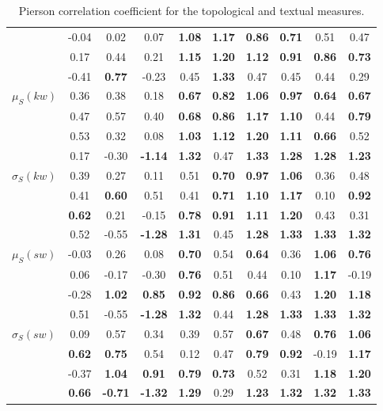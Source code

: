 \begin{table*}[h!]
\begin{center}
\begin{tabular}{| l || c | c | c | c | c | c | c | c | c |}
 & -0.04 & 0.02 & 0.07 & {\bf 1.08} & {\bf 1.17} & {\bf 0.86} & {\bf 0.71} & 0.51 & 0.47 \\
 & 0.17 & 0.44 & 0.21 & {\bf 1.15} & {\bf 1.20} & {\bf 1.12} & {\bf 0.91} & {\bf 0.86} & {\bf 0.73} \\
 & -0.41 & {\bf 0.77} & -0.23 & 0.45 & {\bf 1.33} & 0.47 & 0.45 & 0.44 & 0.29 \\\hline
$\mu_S(kw)$ & 0.36 & 0.38 & 0.18 & {\bf 0.67} & {\bf 0.82} & {\bf 1.06} & {\bf 0.97} & {\bf 0.64} & {\bf 0.67} \\
 & 0.47 & 0.57 & 0.40 & {\bf 0.68} & {\bf 0.86} & {\bf 1.17} & {\bf 1.10} & 0.44 & {\bf 0.79} \\
 & 0.53 & 0.32 & 0.08 & {\bf 1.03} & {\bf 1.12} & {\bf 1.20} & {\bf 1.11} & {\bf 0.66} & 0.52 \\
 & 0.17 & -0.30 & {\bf -1.14} & {\bf 1.32} & 0.47 & {\bf 1.33} & {\bf 1.28} & {\bf 1.28} & {\bf 1.23} \\\hline
$\sigma_S(kw)$ & 0.39 & 0.27 & 0.11 & 0.51 & {\bf 0.70} & {\bf 0.97} & {\bf 1.06} & 0.36 & 0.48 \\
 & 0.41 & {\bf 0.60} & 0.51 & 0.41 & {\bf 0.71} & {\bf 1.10} & {\bf 1.17} & 0.10 & {\bf 0.92} \\
 & {\bf 0.62} & 0.21 & -0.15 & {\bf 0.78} & {\bf 0.91} & {\bf 1.11} & {\bf 1.20} & 0.43 & 0.31 \\
 & 0.52 & -0.55 & {\bf -1.28} & {\bf 1.31} & 0.45 & {\bf 1.28} & {\bf 1.33} & {\bf 1.33} & {\bf 1.32} \\\hline
$\mu_S(sw)$ & -0.03 & 0.26 & 0.08 & {\bf 0.70} & 0.54 & {\bf 0.64} & 0.36 & {\bf 1.06} & {\bf 0.76} \\
 & 0.06 & -0.17 & -0.30 & {\bf 0.76} & 0.51 & 0.44 & 0.10 & {\bf 1.17} & -0.19 \\
 & -0.28 & {\bf 1.02} & {\bf 0.85} & {\bf 0.92} & {\bf 0.86} & {\bf 0.66} & 0.43 & {\bf 1.20} & {\bf 1.18} \\
 & 0.51 & -0.55 & {\bf -1.28} & {\bf 1.32} & 0.44 & {\bf 1.28} & {\bf 1.33} & {\bf 1.33} & {\bf 1.32} \\\hline
$\sigma_S(sw)$ & 0.09 & 0.57 & 0.34 & 0.39 & 0.57 & {\bf 0.67} & 0.48 & {\bf 0.76} & {\bf 1.06} \\
 & {\bf 0.62} & {\bf 0.75} & 0.54 & 0.12 & 0.47 & {\bf 0.79} & {\bf 0.92} & -0.19 & {\bf 1.17} \\
 & -0.37 & {\bf 1.04} & {\bf 0.91} & {\bf 0.79} & {\bf 0.73} & 0.52 & 0.31 & {\bf 1.18} & {\bf 1.20} \\
 & {\bf 0.66} & {\bf -0.71} & {\bf -1.32} & {\bf 1.29} & 0.29 & {\bf 1.23} & {\bf 1.32} & {\bf 1.32} & {\bf 1.33} \\\hline
\end{tabular}
\caption{Pierson correlation coefficient for the topological and textual measures.}
\end{center}
\end{table*}